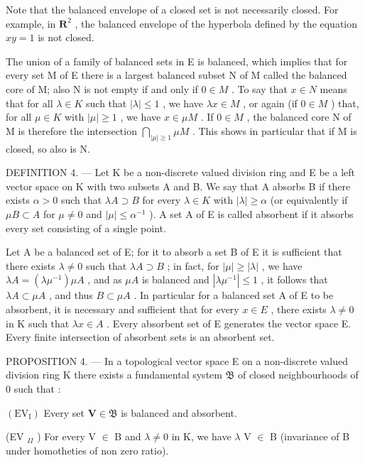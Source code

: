Note that the balanced envelope of a closed set is not necessarily closed. For example, in \(\mathbf{R}^2\) , the balanced envelope of the hyperbola defined by the equation \(xy = 1\) is not closed.

The union of a family of balanced sets in E is balanced, which implies that for every set M of E there is a largest balanced subset N of M called the balanced core of M; also N is not empty if and only if \(0 \in M\) . To say that \(x \in N\) means that for all \(\lambda \in K\) such that \(|\lambda| \leqslant 1\) , we have \(\lambda x \in M\) , or again (if \(0 \in M\) ) that, for all \(\mu \in K\) with \(|\mu| \geqslant 1\) , we have \(x \in \mu M\) . If \(0 \in M\) , the balanced core N of M is therefore the intersection \(\bigcap_{|\mu| \geqslant 1} \mu M\) . This shows in particular that if M is closed, so also is N.

DEFINITION 4. --- Let K be a non-discrete valued division ring and E be a left vector space on K with two subsets A and B. We say that A absorbs B if there exists \(\alpha > 0\) such that \(\lambda A \supset B\) for every \(\lambda \in K\) with \(|\lambda| \geqslant \alpha\) (or equivalently if \(\mu B \subset A\) for \(\mu \neq 0\) and \(|\mu| \leqslant \alpha^{-1}\) ). A set A of E is called absorbent if it absorbs every set consisting of a single point.

Let A be a balanced set of E; for it to absorb a set B of E it is sufficient that there exists \(\lambda \neq 0\) such that \(\lambda A \supset B\) ; in fact, for \(|\mu| \geqslant |\lambda|\) , we have \(\lambda A = (\lambda \mu^{-1}) \mu A\) , and as \(\mu A\) is balanced and \(|\lambda \mu^{-1}| \leqslant 1\) , it follows that \(\lambda A \subset \mu A\) , and thus \(B \subset \mu A\) . In particular for a balanced set A of E to be absorbent, it is necessary and sufficient that for every \(x \in E\) , there exists \(\lambda \neq 0\) in K such that \(\lambda x \in A\) . Every absorbent set of E generates the vector space E. Every finite intersection of absorbent sets is an absorbent set.

PROPOSITION 4. --- In a topological vector space E on a non-discrete valued division ring K there exists a fundamental system \(\mathfrak{B}\) of closed neighbourhoods of 0 such that :

\((\mathrm{EV}_{\mathrm{I}})\) Every set \(\mathbf{V}\in \mathfrak{B}\) is balanced and absorbent.

(EV \(_{II}\) ) For every V \(\in\) B and \(\lambda \neq 0\) in K, we have \(\lambda\) V \(\in\) B (invariance of B under homotheties of non zero ratio).

